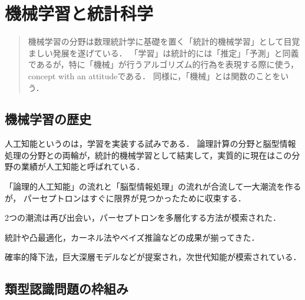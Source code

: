 \documentclass[uplatex,dvipdfmx]{jsreport}
\begin{document}
\chapter{機械学習と統計科学}

\begin{quotation}
    機械学習の分野は数理統計学に基礎を置く「統計的機械学習」として目覚ましい発展を遂げている．
    「学習」は統計的には「推定」「予測」と同義であるが，特に「機械」が行うアルゴリズム的行為を表現する際に使う，concept with an attitudeである．
    同様に，「機械」とは関数のことをいう．
\end{quotation}

\section{機械学習の歴史}

\begin{tcolorbox}[colframe=ForestGreen, colback=ForestGreen!10!white,breakable,colbacktitle=ForestGreen!40!white,coltitle=black,fonttitle=\bfseries\sffamily,
title=]
    人工知能というのは，学習を実装する試みである．
    論理計算の分野と脳型情報処理の分野との両輪が，統計的機械学習として結実して，実質的に現在はこの分野の業績が人工知能と呼ばれている．
\end{tcolorbox}

\begin{history}
    「論理的人工知能」の流れと「脳型情報処理」の流れが合流して一大潮流を作るが，
    パーセプトロンはすぐに限界が見つかったために収束する．
\end{history}

\begin{history}
    2つの潮流は再び出会い，パーセプトロンを多層化する方法が模索された．
\end{history}

\begin{history}[統計的機械学習 (2000s)]
    統計や凸最適化，カーネル法やベイズ推論などの成果が揃ってきた．
\end{history}

\begin{history}[深層学習 (2010s)]
    確率的降下法，巨大深層モデルなどが提案され，次世代知能が模索されている．
\end{history}

\section{類型認識問題の枠組み}
\end{document}
